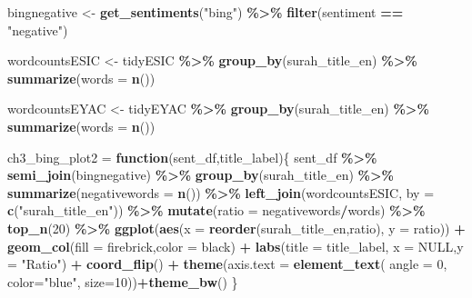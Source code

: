 \documentclass[
]{article}
\newenvironment{Shaded}{\begin{snugshade}}{\end{snugshade}}
\newcommand{\AttributeTok}[1]{\textcolor[rgb]{0.13,0.29,0.53}{#1}}
\newcommand{\ConstantTok}[1]{\textcolor[rgb]{0.56,0.35,0.01}{#1}}
\newcommand{\ControlFlowTok}[1]{\textcolor[rgb]{0.13,0.29,0.53}{\textbf{#1}}}
\newcommand{\DecValTok}[1]{\textcolor[rgb]{0.00,0.00,0.81}{#1}}
\newcommand{\FunctionTok}[1]{\textcolor[rgb]{0.13,0.29,0.53}{\textbf{#1}}}
\newcommand{\NormalTok}[1]{#1}
\newcommand{\OtherTok}[1]{\textcolor[rgb]{0.56,0.35,0.01}{#1}}
\newcommand{\SpecialCharTok}[1]{\textcolor[rgb]{0.81,0.36,0.00}{\textbf{#1}}}
\newcommand{\StringTok}[1]{\textcolor[rgb]{0.31,0.60,0.02}{#1}}
\begin{document}
\begin{Shaded}
\begin{Highlighting}[]
\NormalTok{bingnegative }\OtherTok{\textless{}{-}} \FunctionTok{get\_sentiments}\NormalTok{(}\StringTok{"bing"}\NormalTok{) }\SpecialCharTok{\%\textgreater{}\%} 
  \FunctionTok{filter}\NormalTok{(sentiment }\SpecialCharTok{==} \StringTok{"negative"}\NormalTok{)}

\NormalTok{wordcountsESIC }\OtherTok{\textless{}{-}}\NormalTok{ tidyESIC }\SpecialCharTok{\%\textgreater{}\%}
  \FunctionTok{group\_by}\NormalTok{(surah\_title\_en) }\SpecialCharTok{\%\textgreater{}\%}
  \FunctionTok{summarize}\NormalTok{(}\AttributeTok{words =} \FunctionTok{n}\NormalTok{())}

\NormalTok{wordcountsEYAC }\OtherTok{\textless{}{-}}\NormalTok{ tidyEYAC }\SpecialCharTok{\%\textgreater{}\%}
  \FunctionTok{group\_by}\NormalTok{(surah\_title\_en) }\SpecialCharTok{\%\textgreater{}\%}
  \FunctionTok{summarize}\NormalTok{(}\AttributeTok{words =} \FunctionTok{n}\NormalTok{())}

\NormalTok{ch3\_bing\_plot2 }\OtherTok{=} \ControlFlowTok{function}\NormalTok{(sent\_df,title\_label)\{}
\NormalTok{  sent\_df }\SpecialCharTok{\%\textgreater{}\%}
      \FunctionTok{semi\_join}\NormalTok{(bingnegative) }\SpecialCharTok{\%\textgreater{}\%}
      \FunctionTok{group\_by}\NormalTok{(surah\_title\_en) }\SpecialCharTok{\%\textgreater{}\%}
      \FunctionTok{summarize}\NormalTok{(}\AttributeTok{negativewords =} \FunctionTok{n}\NormalTok{()) }\SpecialCharTok{\%\textgreater{}\%}
      \FunctionTok{left\_join}\NormalTok{(wordcountsESIC, }\AttributeTok{by =} \FunctionTok{c}\NormalTok{(}\StringTok{"surah\_title\_en"}\NormalTok{)) }\SpecialCharTok{\%\textgreater{}\%}
      \FunctionTok{mutate}\NormalTok{(}\AttributeTok{ratio =}\NormalTok{ negativewords}\SpecialCharTok{/}\NormalTok{words) }\SpecialCharTok{\%\textgreater{}\%}
      \FunctionTok{top\_n}\NormalTok{(}\DecValTok{20}\NormalTok{) }\SpecialCharTok{\%\textgreater{}\%}
      \FunctionTok{ggplot}\NormalTok{(}\FunctionTok{aes}\NormalTok{(}\AttributeTok{x =} \FunctionTok{reorder}\NormalTok{(surah\_title\_en,ratio), }\AttributeTok{y =}\NormalTok{ ratio)) }\SpecialCharTok{+}
        \FunctionTok{geom\_col}\NormalTok{(}\AttributeTok{fill =} \StringTok{\textquotesingle{}firebrick\textquotesingle{}}\NormalTok{,}\AttributeTok{color =} \StringTok{\textquotesingle{}black\textquotesingle{}}\NormalTok{) }\SpecialCharTok{+}
        \FunctionTok{labs}\NormalTok{(}\AttributeTok{title =}\NormalTok{ title\_label, }\AttributeTok{x =} \ConstantTok{NULL}\NormalTok{,}\AttributeTok{y =} \StringTok{"Ratio"}\NormalTok{) }\SpecialCharTok{+}
        \FunctionTok{coord\_flip}\NormalTok{() }\SpecialCharTok{+}
        \FunctionTok{theme}\NormalTok{(}\AttributeTok{axis.text =} \FunctionTok{element\_text}\NormalTok{( }
              \AttributeTok{angle =} \DecValTok{0}\NormalTok{, }
              \AttributeTok{color=}\StringTok{"blue"}\NormalTok{, }
              \AttributeTok{size=}\DecValTok{10}\NormalTok{))}\SpecialCharTok{+}\FunctionTok{theme\_bw}\NormalTok{()}
\NormalTok{\}}


\end{Highlighting}
\end{Shaded}
\end{document}
